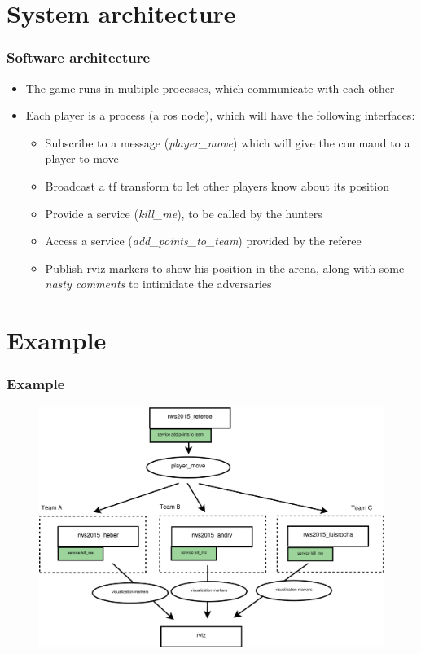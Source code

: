 \documentclass[]{beamer}
\begin{document}
\section{System architecture} 
\begin{frame}\frametitle{Software architecture}
\begin{itemize}
\item The game runs in multiple processes, which communicate with each other
\item Each player is a process (a ros node), which will have the following interfaces: 
\begin{itemize}
\item Subscribe to a message (\textit{player\_move}) which will give the command to a
player to move
\item Broadcast a tf transform to let other players know about its position
\item Provide a service (\textit{kill\_me}), to be called by the hunters
\item Access a service (\textit{add\_points\_to\_team}) provided by the referee
\item Publish rviz markers to show his position in the arena, along with some
\textit{nasty comments} to intimidate the adversaries
\end{itemize}
\end{itemize}
\end{frame}

\section{Example} 
\begin{frame}\frametitle{Example}
\begin{figure}[!t] \scriptsize
\begin{center}
\centerline{
\includegraphics[width=.9\linewidth]{example.pdf}
}
\end{center}
\end{figure}
\end{frame}
\end{document}
